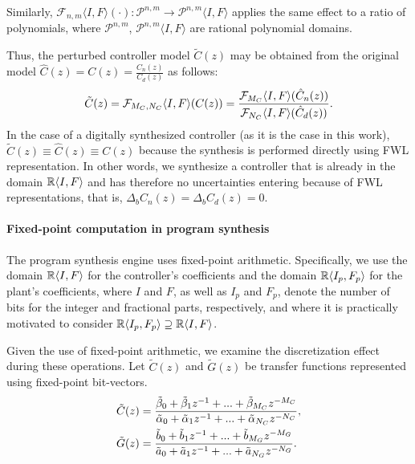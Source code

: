\documentclass[final]{sig-alternate-05-2015}
\begin{document}
Similarly, $\mathcal{F}_{n,m}\langle I,F \rangle(\cdot):\mathcal{P}^{n,m}\rightarrow \mathcal{P}^{n,m}\langle I,F \rangle$ applies the same effect to a ratio of polynomials, where $\mathcal{P}^{n,m}$,  $\mathcal{P}^{n,m}\langle I,F
\rangle$ are rational polynomial domains.

Thus, the perturbed controller model $\tilde{C}(z)$ may be obtained from the
original model $\hat{C}(z) = C(z) = \frac{C_{n}(z)}{C_{d}(z)}$ as follows:
%
\begin{equation}
\tilde{C}(z)=\mathcal{F}_{M_C,N_C}\langle{I},{F}\rangle(C(z))=\frac{\mathcal{F}_{M_C}\langle{I},{F}\rangle (\hat{C}_n(z))}{\mathcal{F}_{N_C}\langle{I},{F}\rangle(\hat{C}_d(z))}.
\end{equation}
%
In the case of a digitally synthesized controller (as it is the case in this
work), $\tilde{C}(z) \equiv \hat{C}(z) \equiv C(z)$ because the synthesis is
performed directly using FWL representation.  In other words, we synthesize
a controller that is already in the domain $\mathbb{R} \langle{I},{F}\rangle$ and has
therefore no uncertainties entering because of FWL representations, that is,
$\Delta_bC_n(z)=\Delta_bC_d(z)=0$.

\paragraph{Fixed-point computation in program synthesis}

The program synthesis engine uses fixed-point arithmetic.  Specifically, we
use the domain $\mathbb{R}\langle{I},{F}\rangle$ for the controller's coefficients
and the domain $\mathbb{R}\langle{I_p},{F_p}\rangle$ for the plant's coefficients,
where $I$ and $F$, as well as $I_p$ and $F_p$, denote the number of bits for
the integer and fractional parts, respectively, and where it is practically
motivated to consider $\mathbb{R}\langle{ I_p},{F_p}\rangle \supseteq
\mathbb{R}\langle{I},{F}\rangle$.


Given the use of fixed-point arithmetic, we examine the discretization effect 
during these operations. Let $\tilde C(z)$ and $\tilde G(z)$ be 
transfer functions represented using fixed-point bit-vectors.
%
\begin{align}
\small
\label{digital_controller_plant_tf}
\tilde C(z)&=\frac{\tilde \beta_{0}+\tilde \beta_{1}z^{-1}+...+\tilde \beta_{M_C}z^{-M_C}}{\tilde \alpha_{0}+\tilde \alpha_{1}z^{-1}+...+\tilde \alpha_{N_C}z^{-N_C}}, \\
\tilde G(z)&=\frac{\tilde b_{0}+\tilde b_{1}z^{-1}+...+\tilde b_{M_G}z^{-M_G}}{\tilde a_{0}+\tilde a_{1}z^{-1}+...+\tilde a_{N_G}z^{-N_G}}.
\end{align}
\end{document}
